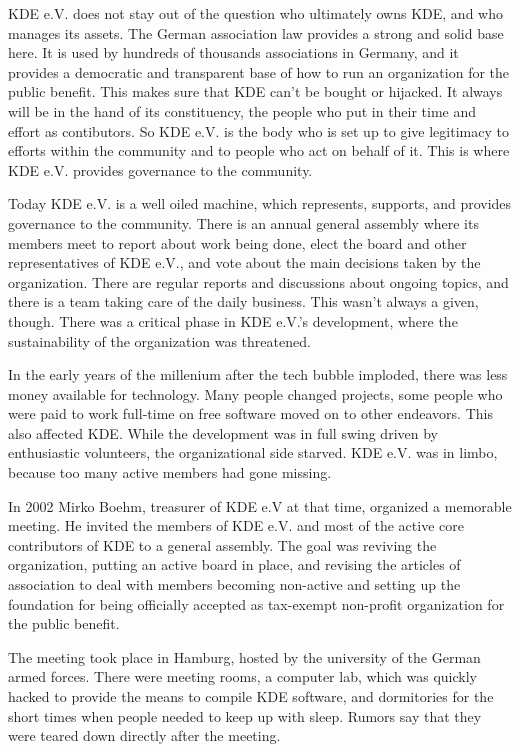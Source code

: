 KDE e.V. does not stay out of the question who ultimately owns KDE, and who manages its assets. The German association law provides a strong and solid base here. It is used by hundreds of thousands associations in Germany, and it provides a democratic and transparent base of how to run an organization for the public benefit. This makes sure that KDE can't be bought or hijacked. It always will be in the hand of its constituency, the people who put in their time and effort as contibutors. So KDE e.V. is the body who is set up to give legitimacy to efforts within the community and to people who act on behalf of it. This is where KDE e.V. provides governance to the community.

Today KDE e.V. is a well oiled machine, which represents, supports, and provides governance to the community. There is an annual general assembly where its members meet to report about work being done, elect the board and other representatives of KDE e.V., and vote about the main decisions taken by the organization. There are regular reports and discussions about ongoing topics, and there is a team taking care of the daily business. This wasn't always a given, though. There was a critical phase in KDE e.V.'s development, where the sustainability of the organization was threatened.

In the early years of the millenium after the tech bubble imploded, there was less money available for technology. Many people changed projects, some people who were paid to work full-time on free software moved on to other endeavors. This also affected KDE. While the development was in full swing driven by enthusiastic volunteers, the organizational side starved. KDE e.V. was in limbo, because too many active members had gone missing.

In 2002 Mirko Boehm, treasurer of KDE e.V at that time, organized a memorable meeting. He invited the members of KDE e.V. and most of the active core contributors of KDE to a general assembly. The goal was reviving the organization, putting an active board in place, and revising the articles of association to deal with members becoming non-active and setting up the foundation for being officially accepted as tax-exempt non-profit organization for the public benefit.

The meeting took place in Hamburg, hosted by the university of the German armed forces. There were meeting rooms, a computer lab, which was quickly hacked to provide the means to compile KDE software, and dormitories for the short times when people needed to keep up with sleep. Rumors say that they were teared down directly after the meeting.

